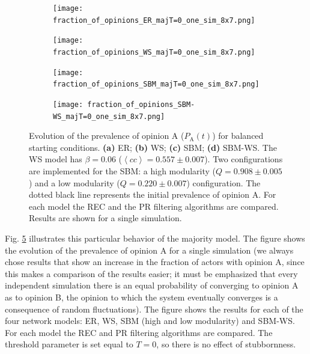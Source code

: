 \documentclass[11 pt , letterpaper , twoside , openright]{book}
\begin{document}
\begin{figure}[H]
  \begin{subfigure}[b]{0.49\textwidth}
    \caption{}
  	\texttt{[image: fraction\_of\_opinions\_ER\_majT=0\_one\_sim\_8x7.png]}
    \label{er_majT}
  \end{subfigure}
  \begin{subfigure}[b]{0.49\textwidth}
    \caption{}
  	\texttt{[image: fraction\_of\_opinions\_WS\_majT=0\_one\_sim\_8x7.png]}
    \label{ws_majT}
  \end{subfigure}
  \begin{subfigure}[b]{0.49\textwidth}
    \caption{}
    \texttt{[image: fraction\_of\_opinions\_SBM\_majT=0\_one\_sim\_8x7.png]}
    \label{sbm_majT}
  \end{subfigure}
  \begin{subfigure}[b]{0.49\textwidth}
    \caption{}
    \texttt{[image: fraction\_of\_opinions\_SBM-WS\_majT=0\_one\_sim\_8x7.png]}
    \label{sbm-ws_majT}
  \end{subfigure}
  \captionsetup{format=plain}
  \caption[Evolution of the prevalence of opinion A ($P_\text{A}(t)$) for balanced starting conditions. Results for one simulation of the majority threshold model with $T=0$.]{Evolution of the prevalence of opinion A ($P_\text{A}(t)$) for balanced starting conditions. \textbf{(a)} ER; \textbf{(b)} WS; \textbf{(c)} SBM; \textbf{(d)} SBM-WS. The WS model has $\beta = 0.06$ ($\left<cc\right> = 0.557 \pm 0.007$). Two configurations are implemented for the SBM: a high modularity ($Q = 0.908 \pm 0.005$) and a low modularity ($Q = 0.220 \pm 0.007$) configuration. The dotted black line represents the initial prevalence of opinion A. For each model the REC and the PR filtering algorithms are compared. Results are shown for a single simulation.}
\label{ev_op_majT_one_sim}
\end{figure}
\noindent
Fig. \ref{ev_op_majT_one_sim} illustrates this particular behavior of the majority model. The figure shows the evolution of the prevalence of opinion A for a single simulation (we always chose results that show an increase in the fraction of actors with opinion A, since this makes a comparison of the results easier; it must be emphasized that every independent simulation there is an equal probability of converging to opinion A as to opinion B, the opinion to which the system eventually converges is a consequence of random fluctuations). The figure shows the results for each of the four network models: ER, WS, SBM (high and low modularity) and SBM-WS. For each model the REC and PR filtering algorithms are compared. The threshold parameter is set equal to $T=0$, so there is no effect of stubbornness.\\
\end{document}
